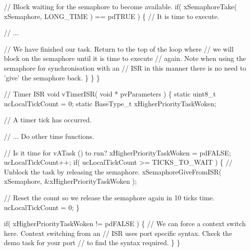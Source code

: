 \begin{DoxyPre}       // Block waiting for the semaphore to become available.
       if( xSemaphoreTake( xSemaphore, LONG\_TIME ) == pdTRUE )
       \{
           // It is time to execute.\end{DoxyPre}



\begin{DoxyPre}           // ...\end{DoxyPre}



\begin{DoxyPre}           // We have finished our task.  Return to the top of the loop where
           // we will block on the semaphore until it is time to execute
           // again.  Note when using the semaphore for synchronisation with an
        // ISR in this manner there is no need to 'give' the semaphore back.
       \}
   \}
\}\end{DoxyPre}



\begin{DoxyPre}// Timer ISR
void vTimerISR( void * pvParameters )
\{
static uint8\_t ucLocalTickCount = 0;
static BaseType\_t xHigherPriorityTaskWoken;\end{DoxyPre}



\begin{DoxyPre}   // A timer tick has occurred.\end{DoxyPre}



\begin{DoxyPre}   // ... Do other time functions.\end{DoxyPre}



\begin{DoxyPre}   // Is it time for vATask () to run?
   xHigherPriorityTaskWoken = pdFALSE;
   ucLocalTickCount++;
   if( ucLocalTickCount >= TICKS\_TO\_WAIT )
   \{
       // Unblock the task by releasing the semaphore.
       xSemaphoreGiveFromISR( xSemaphore, &xHigherPriorityTaskWoken );\end{DoxyPre}



\begin{DoxyPre}       // Reset the count so we release the semaphore again in 10 ticks time.
       ucLocalTickCount = 0;
   \}\end{DoxyPre}



\begin{DoxyPre}   if( xHigherPriorityTaskWoken != pdFALSE )
   \{
       // We can force a context switch here.  Context switching from an
       // ISR uses port specific syntax.  Check the demo task for your port
       // to find the syntax required.
   \}
\}
\end{DoxyPre}
 